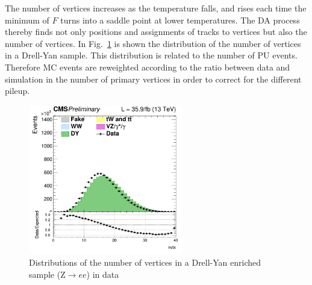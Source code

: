 The number of vertices increases as the temperature falls, and rises each time the minimum of $F$ turns into a saddle point at lower temperatures. 
The DA process thereby finds not only positions and assignments of tracks to vertices but also the number of vertices.
In Fig.~\ref{Fig:pu} is shown the distribution of the number of vertices in a Drell-Yan sample. This distribution is related to the number of PU events. Therefore MC events are reweighted according to the ratio between data and simulation in the number of primary vertices in order to correct for the different pileup. 
\begin{figure}[htbp]
\centering
\includegraphics[width=0.6\textwidth]{../AN/Figs/nvertices.png}
\caption{
    Distributions of the number of vertices in a Drell-Yan enriched sample
    (Z$\rightarrow{}ee$) in
    data}
    \label{Fig:pu}
\end{figure}





